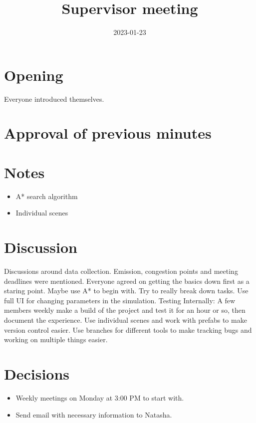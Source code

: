 \documentclass{article}
\newcommand{\meetingdate}{2023-01-23}
\newcommand{\meetingtime}{14:00}
\newcommand{\meetingplace}{EG2515}
\newcommand{\meetingtitle}{Supervisor meeting}
\newcommand{\attendees}{\martin \and \felix \and \hannes \and \marcus \and \jakob}
\begin{document}
    \begin{titlepage}
        \title{\meetingtitle}
        \date{\meetingdate}
        \maketitle
        
        \thispagestyle{first}
        
        \timeanddate{\meetingdate \space \meetingtime}
        \place{\meetingplace}
        \called{\members}
        \attended{\attendees}
    \end{titlepage}
    \newpage
    \pagestyle{fancy}

    \section{Opening}
        Everyone introduced themselves.

    \section{Approval of previous minutes}
        \hannes
        
    \section{Notes}
        \begin{itemize}
            \item A* search algorithm
            \item Individual scenes
        \end{itemize}

    \section{Discussion}
        Discussions around data collection. Emission, congestion points and meeting deadlines were mentioned. Everyone agreed on getting the basics down first as a staring point. Maybe use A* to begin with. Try to really break down tasks. Use full UI for changing parameters in the simulation. Testing Internally: A few members weekly make a build of the project and test it for an hour or so, then document the experience. Use individual scenes and work with prefabs to make version control easier. Use branches for different tools to make tracking bugs and working on multiple things easier.

    \section{Decisions}
        \begin{itemize}
            \item Weekly meetings on Monday at 3:00 PM to start with.
            \item Send email with necessary information to Natasha.
        \end{itemize}
    
\end{document}
